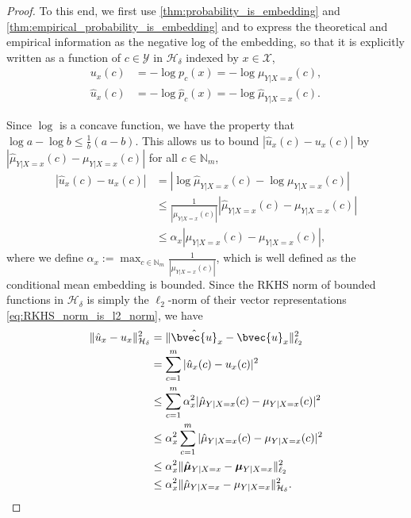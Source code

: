 \documentclass[runningheads, envcountsame, a4paper]{llncs}
\begin{document}
\begin{proof}
			To this end, we first use \cref{thm:probability_is_embedding} and \cref{thm:empirical_probability_is_embedding} and to express the theoretical and empirical information as the negative log of the embedding, so that it is explicitly written as a function of $c \in \mathcal{Y}$ in $\mathcal{H}_{\delta}$ indexed by $x \in \mathcal{X}$,
			\begin{equation}
				\begin{aligned}
				u_{x}(c) &= - \log{p_{c}(x)} = -\log{\mu_{Y | X = x}(c)}, \\
				\hat{u}_{x}(c) &= - \log{\hat{p}_{c}(x)} = -\log{\hat{\mu}_{Y | X = x}(c)}.
			\end{aligned}
			\end{equation}
			
			Since $\log$ is a concave function, we have the property that $\log{a} - \log{b} \leq \frac{1}{b} (a - b)$. This allows us to bound $| \hat{u}_{x}(c) - u_{x}(c) |$ by $| \hat{\mu}_{Y | X = x}(c) - \mu_{Y | X = x}(c) |$ for all $c \in \mathbb{N}_{m}$,
			\begin{equation}
			\begin{aligned}
				| \hat{u}_{x}(c) - u_{x}(c) | &= | \log{\hat{\mu}_{Y | X = x}(c)} - \log{\mu_{Y | X = x}(c)} | \\
				&\leq \frac{1}{| \mu_{Y | X = x}(c) |} | \hat{\mu}_{Y | X = x}(c) - \mu_{Y | X = x}(c) | \\
				&\leq \alpha_{x} | \hat{\mu}_{Y | X = x}(c) - \mu_{Y | X = x}(c) |,
			\end{aligned}
			\end{equation}
			where we define $\alpha_{x} := \max_{c \in \mathbb{N}_{m}} \frac{1}{| \mu_{Y | X = x}(c) |}$, which is well defined as the conditional mean embedding is bounded. Since the \gls{RKHS} norm of bounded functions in $\mathcal{H}_{\delta}$ is simply the $\ell_{2}$-norm of their vector representations \eqref{eq:RKHS_norm_is_l2_norm}, we have
			\begin{equation}
			\begin{aligned}
				\| \hat{u}_{x} - u_{x} \|_{\mathcal{H}_{\delta}}^{2} &= \| \hat{\bvec{u}}_{x} - \bvec{u}_{x} \|_{\ell_{2}}^{2} \\
				&= \sum_{c = 1}^{m} | \hat{u}_{x}(c) - u_{x}(c) |^{2} \\
				&\leq \sum_{c = 1}^{m} \alpha_{x}^{2} | \hat{\mu}_{Y | X = x}(c) - \mu_{Y | X = x}(c) |^{2} \\
				&\leq \alpha_{x}^{2} \sum_{c = 1}^{m} | \hat{\mu}_{Y | X = x}(c) - \mu_{Y | X = x}(c) |^{2} \\
				&\leq \alpha_{x}^{2} \| \hat{\bm{\mu}}_{Y | X = x} - \bm{\mu}_{Y | X = x}  \|_{\ell_{2}}^{2} \\
				&\leq \alpha_{x}^{2} \| \hat{\mu}_{Y | X = x} - \mu_{Y | X = x} \|_{\mathcal{H}_{\delta}}^{2}.
			\end{aligned}
			\end{equation}
			

\end{proof}
\end{document}
